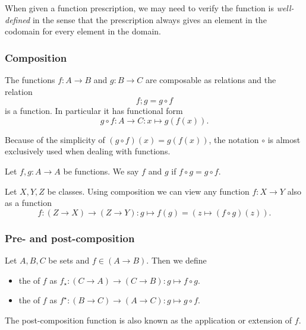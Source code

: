 When given a function prescription, we may need to verify the function is \emph{well-defined} in the sense that the prescription always gives an element in the codomain for every element in the domain.

\subsubsection{Composition}
\begin{lemma}
The functions $f:A\to B$ and $g:B\to C$ are composable as relations and the relation
\[ f;g = g\circ f \]
is a function. In particular it has functional form
\[ g\circ f: A\to C: x\mapsto g(f(x)). \]
\end{lemma}
Because of the simplicity of $(g\circ f)(x) = g(f(x))$, the notation $\circ$ is almost exclusively used when dealing with functions.

\begin{definition}
Let $f, g:A\to A$ be functions. We say $f$ and $g$  if $f\circ g = g\circ f$.
\end{definition}

\begin{note}
Let $X,Y,Z$ be classes. Using composition we can view any function $f: X\to Y$ also as a function
\[ f: (Z\to X)\to (Z\to Y): g\mapsto f(g) = (z\mapsto (f\circ g)(z)). \]
\end{note}

\subsubsection{Pre- and post-composition}
\begin{definition}
Let $A,B,C$ be sets and $f\in (A\to B)$. Then we define
\begin{itemize}
\item the  of $f$ as $f_\star: (C\to A) \to (C\to B): g\mapsto f\circ g$.
\item the  of $f$ as $f^\star: (B\to C) \to (A\to C): g\mapsto g\circ f$.
\end{itemize}
The post-composition function is also known as the  application or extension of $f$.
\end{definition}

